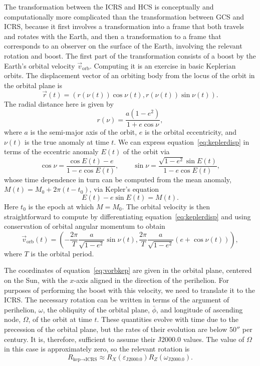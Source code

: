 The transformation between the ICRS and HCS is conceptually and computationally more complicated than the transformation between GCS and ICRS, because it first involves a transformation into a frame that both travels and rotates with the Earth, and then a transformation to a frame that corresponds to an observer on the surface of the Earth, involving the relevant rotation and boost. The first part of the transformation consists of a boost by the Earth's orbital velocity $\vec{v}_\text{orb}$. Computing it is an exercise in basic Keplerian orbits. The displacement vector of an orbiting body from the locus of the orbit in the orbital plane is
\begin{equation}
    \vec{r}(t)=(r(\nu(t))\cos\nu(t),r(\nu(t))\sin\nu(t)).
    \label{eq:keplerdisp}
\end{equation}
The radial distance here is given by
\begin{equation}
    r(\nu)=\frac{a(1-e^2)}{1+e\cos\nu},
\end{equation}
where $a$ is the semi-major axis of the orbit, $e$ is the orbital eccentricity, and $\nu(t)$ is the true anomaly at time $t$. We can express equation~\eqref{eq:keplerdisp} in terms of the eccentric anomaly $E(t)$ of the orbit via
\begin{equation}
    \cos\nu=\frac{\cos E(t)-e}{1-e\cos E(t)},\qquad\sin\nu=\frac{\sqrt{1-e^2}\sin E(t)}{1-e\cos E(t)},
\end{equation}
whose time dependence in turn can be computed from the mean anomaly, $M(t)=M_0+2\pi(t-t_0)$, via Kepler's equation
\begin{equation}
    E(t)-e\sin E(t)=M(t).
\end{equation}
Here $t_0$ is the epoch at which $M=M_0$. The orbital velocity is then straightforward to compute by differentiating equation~\eqref{eq:keplerdisp} and using conservation of orbital angular momentum to obtain
\begin{equation}
    \vec{v}_\text{orb}(t)=\left(-\frac{2\pi}{T}\frac{a}{\sqrt{1-e^2}}\sin\nu(t),\frac{2\pi}{T}\frac{a}{\sqrt{1-e^2}}(e+\cos\nu(t))\right),
    \label{eq:vorbkep}
\end{equation}
where $T$ is the orbital period.

The coordinates of equation~\eqref{eq:vorbkep} are given in the orbital plane, centered on the Sun, with the $x$-axis aligned in the direction of the perihelion. For purposes of performing the boost with this velocity, we need to translate it to the ICRS. The necessary rotation can be written in terms of the argument of perihelion, $\omega$, the obliquity of the orbital plane, $\bar{\phi}$, and longitude of ascending node, $\Omega$, of the orbit at time $t$. These quantities evolve with time due to the precession of the orbital plane, but the rates of their evolution are below $50''$ per century. It is, therefore, sufficient to assume their J2000.0 values. The value of $\Omega$ in this case is approximately zero, so the relevant rotation is
\begin{equation}
    R_{\text{kep}\rightarrow\text{ICRS}}\approx R_X(\varepsilon_\text{J2000.0})R_Z(\omega_\text{J2000.0}).
\end{equation}

